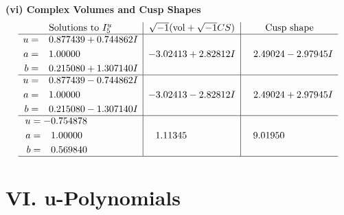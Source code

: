 \documentclass[1p]{elsarticle_modified}
\theoremstyle{definition}
\newcommand{\I}{\sqrt{-1}}
\begin{document}
\newpage\flushleft \textbf{(vi) Complex Volumes and Cusp Shapes}
$$\begin{array}{c|c|c}  
\text{Solutions to }I^u_{5}& \I (\text{vol} + \sqrt{-1}CS) & \text{Cusp shape}\\
 \hline 
\begin{aligned}
u &= \phantom{-}0.877439 + 0.744862 I \\
a &= \phantom{-}1.00000\phantom{ +0.000000I} \\
b &= \phantom{-}0.215080 + 1.307140 I\end{aligned}
 & -3.02413 + 2.82812 I & \phantom{-}2.49024 - 2.97945 I \\ \hline\begin{aligned}
u &= \phantom{-}0.877439 - 0.744862 I \\
a &= \phantom{-}1.00000\phantom{ +0.000000I} \\
b &= \phantom{-}0.215080 - 1.307140 I\end{aligned}
 & -3.02413 - 2.82812 I & \phantom{-}2.49024 + 2.97945 I \\ \hline\begin{aligned}
u &= -0.754878\phantom{ +0.000000I} \\
a &= \phantom{-}1.00000\phantom{ +0.000000I} \\
b &= \phantom{-}0.569840\phantom{ +0.000000I}\end{aligned}
 & \phantom{-}1.11345\phantom{ +0.000000I} & \phantom{-}9.01950\phantom{ +0.000000I}\\
 \hline 
 \end{array}$$\newpage
\newpage\renewcommand{\arraystretch}{1}
\centering \section*{ VI. u-Polynomials}
\end{document}

